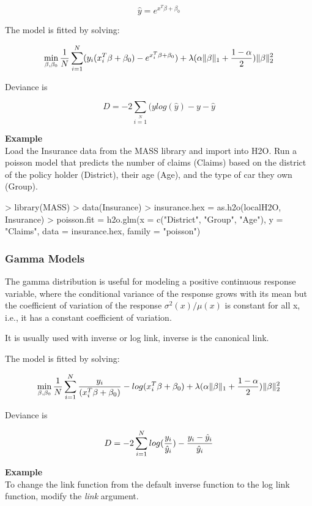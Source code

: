 \documentclass[11pt]{article}
\begin{document}
\[\hat{y} = e^{x^T\beta + \beta_0}\]

The model is fitted by solving:

\[  \min\limits_{\beta,\beta_0} { {1 \over N}\sum\limits_{i=1}\limits^{N}(y_i (x_i^{T}\beta  + \beta_0) - e^{x_i^{T}\beta  + \beta_0})  + \lambda (\alpha \|\beta \|_1 + {1-\alpha \over 2}) \| \beta \|_2^2} \]

Deviance is 

\[D = -2\sum\limits_{i=1}\limits^{N}{(y log(\hat{y}) - y - \hat{y}}\]


\textbf{Example}\\
Load the Insurance data from the MASS library and import into H2O. Run a poisson model that predicts the number of claims (Claims) based on the district of the policy holder (District), their age (Age), and the type of car they own (Group).
\begin{spverbatim}
> library(MASS)
> data(Insurance)
> insurance.hex = as.h2o(localH2O, Insurance)
> poisson.fit = h2o.glm(x = c("District", "Group", "Age"), y = "Claims", 
data = insurance.hex, family = "poisson")
\end{spverbatim}

\subsubsection{Gamma Models}
The gamma distribution is useful for modeling a positive continuous response variable, where the conditional variance of the response grows with its mean but  the coefficient of variation of the response $\sigma^2(x)/μ(x)$ is constant for all x,  i.e., it has a constant coefficient of variation.

It is usually used with inverse or log link, inverse is the canonical link.

The model is fitted by solving:

\[  \min\limits_{\beta,\beta_0} { {1 \over N}\sum\limits_{i=1}\limits^{N}{y_i \over (x_i^{T}\beta  + \beta_0)} - log({x_i^{T}\beta  + \beta_0})  + \lambda (\alpha \|\beta \|_1 + {1-\alpha \over 2}) \| \beta \|_2^2} \]

Deviance is 

\[D = -2\sum\limits_{i=1}\limits^{N}{log({y_i \over \hat{y}_i}) - {y_i - \hat{y}_i \over\hat{y}_i }}\]


\textbf{Example}\\
To change the link function from the default inverse function to the log link function, modify the \textit{link} argument.
\end{document}
